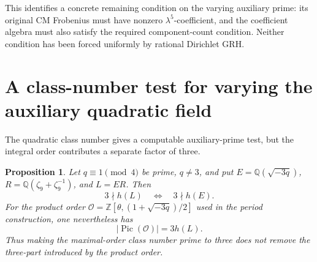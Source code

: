 \documentclass[11pt]{article}
\newtheorem{proposition}[theorem]{Proposition}
\theoremstyle{definition}
\theoremstyle{remark}
\begin{document}
This identifies a concrete remaining condition on the varying
auxiliary prime: its original CM Frobenius must have nonzero
\(\lambda^5\)-coefficient, and the coefficient algebra must
also satisfy the required component-count condition. Neither
condition has been forced uniformly by rational Dirichlet GRH.

\section{A class-number test for varying the auxiliary quadratic field}
\label{sec:kummer-varying-q-classnumber}
The quadratic class number gives a computable auxiliary-prime test, but the integral order contributes a separate factor of three.

\begin{proposition}\label{prop:kummer-varying-q-classnumber}
Let \(q\equiv1\pmod4\) be prime, \(q\ne3\), and put
\(E=\mathbb Q(\sqrt{-3q})\),
\(R=\mathbb Q(\zeta_9+\zeta_9^{-1})\), and \(L=ER\).
Then
\[
 3\nmid h(L)\quad\Longleftrightarrow\quad3\nmid h(E).
\]
For the product order
\(\mathcal O=\mathbb Z[\theta,(1+\sqrt{-3q})/2]\)
used in the period construction, one nevertheless has
\[
 |\operatorname{Pic}(\mathcal O)|=3h(L).
\]
Thus making the maximal-order class number prime to three
does not remove the three-part introduced by the product order.
\end{proposition}
\end{document}
